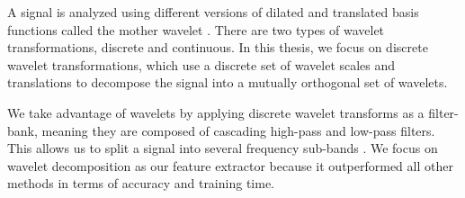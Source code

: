 \documentclass{turabian-thesis}
\begin{document}
A signal is analyzed using different versions of dilated and translated basis functions called the mother wavelet  \cite{strang_wavelets_1996}. There are two types of wavelet transformations, discrete and continuous. In this thesis, we focus on discrete wavelet transformations, which use a discrete set of wavelet scales and translations to decompose the signal into a mutually orthogonal set of wavelets. 

We take advantage of wavelets by applying discrete wavelet transforms as a filter-bank, meaning they are composed of cascading high-pass and low-pass filters. This allows us to split a signal into several frequency sub-bands  \cite{strang_wavelets_1996}. We focus on wavelet decomposition as our feature extractor because it outperformed all other methods in terms of accuracy and training time.















\end{document}
